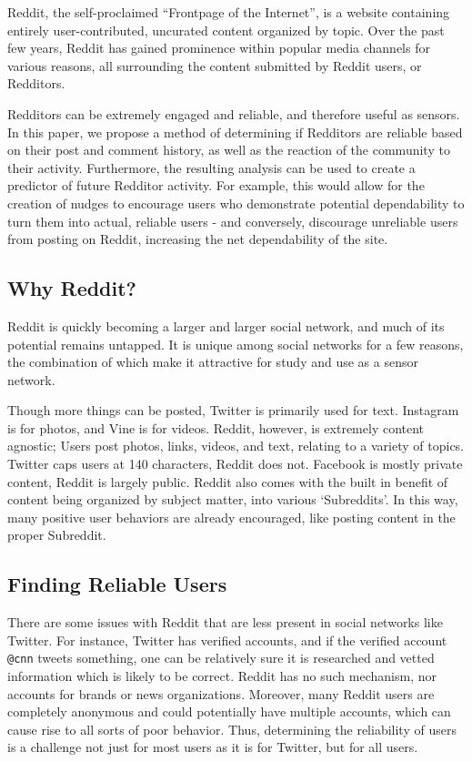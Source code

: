 Reddit, the self-proclaimed ``Frontpage of the Internet'', is a website
containing entirely user-contributed, uncurated content organized by topic. Over
the past few years, Reddit has gained prominence within popular media channels
for various reasons, all surrounding the content submitted by Reddit users, or
Redditors.

Redditors can be extremely engaged and reliable, and therefore useful as
sensors. In this paper, we propose a method of determining if Redditors are
reliable based on their post and comment history, as well as the reaction of the
community to their activity. Furthermore, the resulting analysis can be used to
create a predictor of future Redditor activity. For example, this would allow
for the creation of nudges to encourage users who demonstrate potential
dependability to turn them into actual, reliable users - and conversely,
discourage unreliable users from posting on Reddit, increasing the net
dependability of the site.

\subsection{Why Reddit?}
\label{sub:why_reddit}

Reddit is quickly becoming a larger and larger social network, and much of its
potential remains untapped. It is unique among social networks for a few
reasons, the combination of which make it attractive for study and use as a
sensor network.

Though more things can be posted, Twitter is primarily used for text. Instagram
is for photos, and Vine is for videos. Reddit, however, is extremely content
agnostic; Users post photos, links, videos, and text, relating to a variety of
topics. Twitter caps users at 140 characters, Reddit does not. Facebook is
mostly private content, Reddit is largely public. Reddit also comes with the
built in benefit of content being organized by subject matter, into various
`Subreddits'. In this way, many positive user behaviors are already encouraged,
like posting content in the proper Subreddit.


\subsection{Finding Reliable Users}
\label{sub:finding_reliable_users}

There are some issues with Reddit that are less present in social networks like
Twitter. For instance, Twitter has verified accounts, and if the verified
account \texttt{@cnn} tweets something, one can be relatively sure it is
researched and vetted information which is likely to be correct. Reddit has no
such mechanism, nor accounts for brands or news organizations. Moreover, many
Reddit users are completely anonymous and could potentially have multiple
accounts, which can cause rise to all sorts of poor behavior. Thus, determining
the reliability of users is a challenge not just for most users as it is for
Twitter, but for all users.

